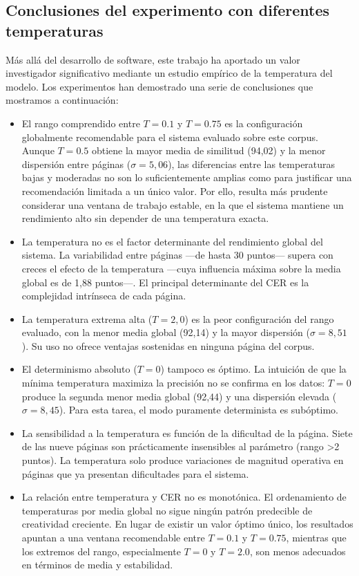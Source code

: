\subsection{Conclusiones del experimento con diferentes temperaturas}

Más allá del desarrollo de software, este trabajo ha aportado un valor investigador significativo mediante un estudio empírico de la temperatura del modelo. Los experimentos han demostrado una serie de conclusiones que mostramos a continuación:

\begin{itemize}
    \item El rango comprendido entre \(T=0.1\) y \(T=0.75\) es la configuración globalmente recomendable para el sistema evaluado sobre este corpus. Aunque \(T=0.5\) obtiene la mayor media de similitud (94,02) y la menor dispersión entre páginas (\(\sigma=5,06\)), las diferencias entre las temperaturas bajas y moderadas no son lo suficientemente amplias como para justificar una recomendación limitada a un único valor. Por ello, resulta más prudente considerar una ventana de trabajo estable, en la que el sistema mantiene un rendimiento alto sin depender de una temperatura exacta.

    \item La temperatura no es el factor determinante del rendimiento global del sistema. La variabilidad entre páginas ---de hasta 30 puntos--- supera con creces el efecto de la temperatura ---cuya influencia máxima sobre la media global es de 1,88 puntos---. El principal determinante del CER es la complejidad intrínseca de cada página.
    
    \item La temperatura extrema alta (\(T=2,0\)) es la peor configuración del rango evaluado, con la menor media global (92,14) y la mayor dispersión (\(\sigma=8,51\)). Su uso no ofrece ventajas sostenidas en ninguna página del corpus.
    
    \item El determinismo absoluto (\(T=0\)) tampoco es óptimo. La intuición de que la mínima temperatura maximiza la precisión no se confirma en los datos: \(T=0\) produce la segunda menor media global (92,44) y una dispersión elevada (\(\sigma=8,45\)). Para esta tarea, el modo puramente determinista es subóptimo.
    
    \item La sensibilidad a la temperatura es función de la dificultad de la página. Siete de las nueve páginas son prácticamente insensibles al parámetro (rango \textgreater 2 puntos). La temperatura solo produce variaciones de magnitud operativa en páginas que ya presentan dificultades para el sistema.
    
    \item La relación entre temperatura y CER no es monotónica. El ordenamiento de temperaturas por media global no sigue ningún patrón predecible de creatividad creciente. En lugar de existir un valor óptimo único, los resultados apuntan a una ventana recomendable entre \(T=0.1\) y \(T=0.75\), mientras que los extremos del rango, especialmente \(T=0\) y \(T=2.0\), son menos adecuados en términos de media y estabilidad.
\end{itemize}

